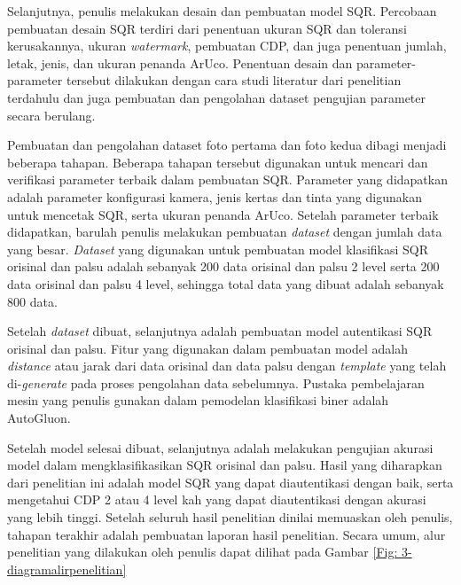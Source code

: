 Selanjutnya, penulis melakukan desain dan pembuatan model SQR. Percobaan pembuatan desain SQR terdiri dari penentuan ukuran SQR dan toleransi kerusakannya,
ukuran \emph{watermark}, pembuatan CDP, dan juga penentuan jumlah, letak, jenis, dan ukuran penanda ArUco. Penentuan desain dan parameter-parameter tersebut
dilakukan dengan cara studi literatur dari penelitian terdahulu dan juga pembuatan dan pengolahan dataset pengujian parameter secara berulang.

Pembuatan dan pengolahan dataset foto pertama dan foto kedua dibagi menjadi beberapa tahapan. Beberapa tahapan tersebut digunakan untuk mencari dan verifikasi
parameter terbaik dalam pembuatan SQR. Parameter yang didapatkan adalah parameter konfigurasi kamera, jenis kertas dan tinta yang digunakan untuk mencetak SQR,
serta ukuran penanda ArUco. Setelah parameter terbaik didapatkan, barulah penulis melakukan pembuatan \emph{dataset} dengan jumlah data yang besar.
\emph{Dataset} yang digunakan untuk pembuatan model klasifikasi SQR orisinal dan palsu adalah sebanyak 200 data orisinal dan palsu 2 level serta 200 data
orisinal dan palsu 4 level, sehingga total data yang dibuat adalah sebanyak 800 data.

Setelah \emph{dataset} dibuat, selanjutnya adalah pembuatan model autentikasi SQR orisinal dan palsu. Fitur yang digunakan dalam pembuatan model adalah
\emph{distance} atau jarak dari data orisinal dan data palsu dengan \emph{template} yang telah di-\emph{generate} pada proses pengolahan data sebelumnya.
Pustaka pembelajaran mesin yang penulis gunakan dalam pemodelan klasifikasi biner adalah AutoGluon.

Setelah model selesai dibuat, selanjutnya adalah melakukan pengujian akurasi model dalam mengklasifikasikan SQR orisinal dan palsu. Hasil yang diharapkan dari
penelitian ini adalah model SQR yang dapat diautentikasi dengan baik, serta mengetahui CDP 2 atau 4 level kah yang dapat diautentikasi dengan akurasi yang
lebih tinggi. Setelah seluruh hasil penelitian dinilai memuaskan oleh penulis, tahapan terakhir adalah pembuatan laporan hasil penelitian. Secara umum, alur
penelitian yang dilakukan oleh penulis dapat dilihat pada Gambar \ref{Fig: 3-diagramalirpenelitian}

\clearpage

